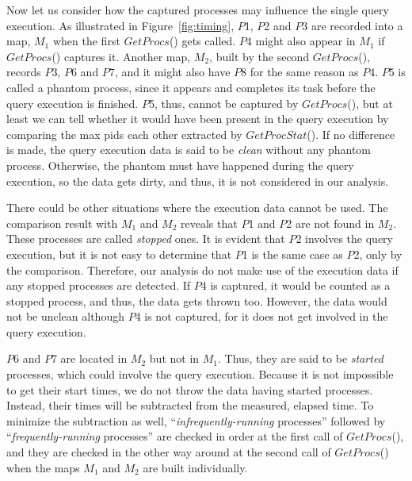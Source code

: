Now let us consider how the captured processes may influence 
the single query execution. 
As illustrated in Figure~\ref{fig:timing}, 
$P$1, $P$2 and $P$3 are recorded into a map, $M_{1}$ when the first $GetProcs$() 
gets called. 
$P$4 might also appear in $M_{1}$ if $GetProcs$() captures it. 
Another map, $M_{2}$, built by the second $GetProcs$(), 
records $P$3, $P$6 and $P$7, and it might also have $P$8 
for the same reason as $P$4. 
$P$5 is called a phantom process, since it appears and completes 
its task before the query execution is finished. 
$P$5, thus, cannot be captured by $GetProcs$(), but at least we can tell 
whether it would have been present in the query execution 
by comparing the max pids each other extracted by $GetProcStat$(). 
If no difference is made, the query execution data is said to be {\em clean} 
without any phantom process. 
Otherwise, the phantom must have happened during the query execution, so 
the data gets dirty, and thus, it is not considered in our analysis. 

There could be other situations where the execution data cannot be 
used. 
The comparison result with $M_{1}$ and $M_{2}$ reveals that 
$P$1 and $P$2 are not found in $M_{2}$. 
These processes are called {\em stopped} ones. 
It is evident that $P$2 involves the query execution, but it is not easy 
to determine that $P$1 is the same case as $P$2, only by the comparison. 
Therefore, our analysis do not make use of the execution data 
if any stopped processes are detected. 
If $P$4 is captured, it would be counted as a stopped process, and thus, 
the data gets thrown too. 
However, the data would not be unclean although $P$4 is not captured, 
for it does not get involved in the query execution. 

$P$6 and $P$7 are located in $M_{2}$ but not in $M_{1}$. 
Thus, they are said to be {\em started} processes, which could involve 
the query execution. 
Because it is not impossible to get their start times, 
we do not throw the data having started processes. 
Instead, their times will be subtracted from the measured, elapsed time.
To minimize the subtraction as well, 
``{\em infrequently-running} processes'' followed by 
``{\em frequently-running} processes'' are checked in order 
at the first call of $GetProcs$(), and they are checked 
in the other way around at the second call of $GetProcs$() 
when the maps $M_{1}$ and $M_{2}$ are built individually. 

